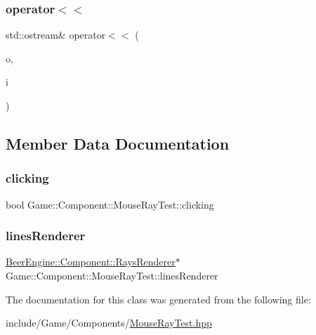 \subsubsection{\texorpdfstring{operator$<$$<$}{operator<<}}
{\footnotesize\ttfamily std\+::ostream\& operator$<$$<$ (\begin{DoxyParamCaption}\item[{std\+::ostream \&}]{o,  }\item[{\mbox{\hyperlink{class_game_1_1_component_1_1_mouse_ray_test}{Mouse\+Ray\+Test}} const \&}]{i }\end{DoxyParamCaption})\hspace{0.3cm}{\ttfamily [friend]}}



\subsection{Member Data Documentation}
\mbox{\label{class_game_1_1_component_1_1_mouse_ray_test_a526049c590ec69e6dcdbf127aaa0a244}} 
\subsubsection{\texorpdfstring{clicking}{clicking}}
{\footnotesize\ttfamily bool Game\+::\+Component\+::\+Mouse\+Ray\+Test\+::clicking}

\mbox{\label{class_game_1_1_component_1_1_mouse_ray_test_a0c6d4f0a878531fcfc83add4258b8eae}} 
\subsubsection{\texorpdfstring{lines\+Renderer}{linesRenderer}}
{\footnotesize\ttfamily \mbox{\hyperlink{class_beer_engine_1_1_component_1_1_rays_renderer}{Beer\+Engine\+::\+Component\+::\+Rays\+Renderer}}$\ast$ Game\+::\+Component\+::\+Mouse\+Ray\+Test\+::lines\+Renderer}



The documentation for this class was generated from the following file\+:\begin{DoxyCompactItemize}
\item 
include/\+Game/\+Components/\mbox{\hyperlink{_mouse_ray_test_8hpp}{Mouse\+Ray\+Test.\+hpp}}\end{DoxyCompactItemize}
